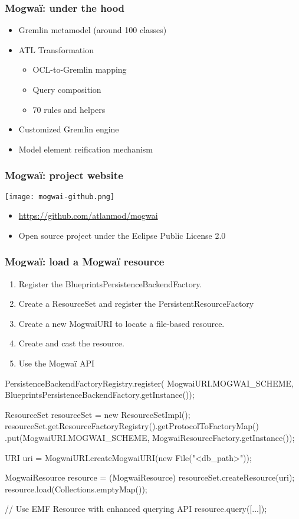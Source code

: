 \begin{frame}[c]\frametitle{Mogwa\"i: under the hood}
	\begin{itemize}
	\item Gremlin metamodel (around 100 classes)
	\item ATL Transformation
	\begin{itemize}
		\item OCL-to-Gremlin mapping
		\item Query composition
		\item 70 rules and helpers
	\end{itemize}
	\item Customized Gremlin engine
	\item Model element reification mechanism
	\end{itemize}
\end{frame}

\begin{frame}[c]\frametitle{Mogwa\"i: project website}
  \begin{center}
    \texttt{[image: mogwai-github.png]}
  \end{center}
	
  \begin{itemize}
  \item \url{https://github.com/atlanmod/mogwai}
  \item Open source project under the Eclipse Public License 2.0
  \end{itemize}
\end{frame}

\begin{frame}[fragile]\frametitle{Mogwa\"i: load a Mogwa\"i resource}
\begin{enumerate}
	\item Register the BlueprintsPersistenceBackendFactory.
	\item Create a ResourceSet and register the PersistentResourceFactory
	\item Create a new MogwaiURI to locate a file-based resource.
	\item Create and cast the resource.
	\item Use the Mogwa\"i API
	\end{enumerate}
	
  \begin{java}
PersistenceBackendFactoryRegistry.register(
	MogwaiURI.MOGWAI_SCHEME, BlueprintsPersistenceBackendFactory.getInstance());
		
ResourceSet resourceSet = new ResourceSetImpl();
resourceSet.getResourceFactoryRegistry().getProtocolToFactoryMap()
	.put(MogwaiURI.MOGWAI_SCHEME, MogwaiResourceFactory.getInstance());
		
URI uri = MogwaiURI.createMogwaiURI(new File("<db_path>"));

MogwaiResource resource = (MogwaiResource) resourceSet.createResource(uri);
resource.load(Collections.emptyMap());

// Use EMF Resource with enhanced querying API
resource.query([...]);  
  \end{java}
\end{frame}

